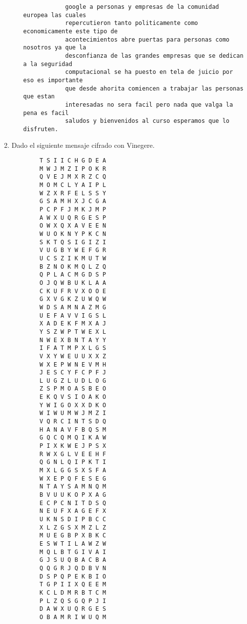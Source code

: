 \documentclass[letterpaper,10pt]{article}
\begin{document}
\begin{enumerate}
\begin{enumerate}
\begin{verbatim}
            google a personas y empresas de la comunidad europea las cuales 
            repercutieron tanto politicamente como economicamente este tipo de 
            acontecimientos abre puertas para personas como nosotros ya que la 
            desconfianza de las grandes empresas que se dedican a la seguridad 
            computacional se ha puesto en tela de juicio por eso es importante 
            que desde ahorita comiencen a trabajar las personas que estan 
            interesadas no sera facil pero nada que valga la pena es facil 
            saludos y bienvenidos al curso esperamos que lo disfruten.
        \end{verbatim}
    \end{enumerate}
    
    \item Dado el siguiente mensaje cifrado con Vinegere.
    \begin{multicols}{4}
    \begin{verbatim}
        T S I I C H G D E A
        M W J M Z I P O K R
        Q V E J M X R Z C Q
        M O M C L Y A I P L
        W Z X R F E L S S Y
        G S A M H X J C G A
        P C P F J M K J M P
        A W X U Q R G E S P
        O W X Q X A V E E N
        W U O K N Y P K C N
        S K T Q S I G I Z I
        V U G B Y W E F G R
        U C S Z I K M U T W
        B Z N O K M Q L Z Q
        Q P L A C M G D S P
        O J Q W B U K L A A
        C K U F R V X O O E
        G X V G K Z U W Q W
        W D S A M N A Z M G
        U E F A V V I G S L
        X A D E K F M X A J
        Y S Z W P T W E X L
        N W E X B N T A Y Y
        I F A T M P X L G S
        V X Y W E U U X X Z
        W X E P W N E V M H
        J E S C Y F C P F J
        L U G Z L U D L O G
        Z S P M O A S B E O
        E K Q V S I O A K O
        Y W I G O X X D K O
        W I W U M W J M Z I
        V Q R C I N T S D Q
        H A N A V F B Q S M
        G Q C Q M Q I K A W
        P I X K W E J P S X
        R W X G L V E E H F
        Q G N L Q I P K T I
        M X L G G S X S F A
        W X E P Q F E S E G
        N T A Y S A M N Q M
        B V U U K O P X A G
        E C P C N I T D S Q
        N E U F X A G E F X
        U K N S D I P B C C
        X L Z G S X M Z L Z
        M U E G B P X B K C
        E S W T I L A W Z W
        M Q L B T G I V A I
        G J S U Q B A C B A
        Q Q G R J Q D B V N
        D S P Q P E K B I O
        T G P I I X Q E E M
        K C L D M R B T C M
        P L Z Q S G Q P J I
        D A W X U Q R G E S
        O B A M R I W U Q M

\end{verbatim}
\end{multicols}
\end{enumerate}
\end{document}
